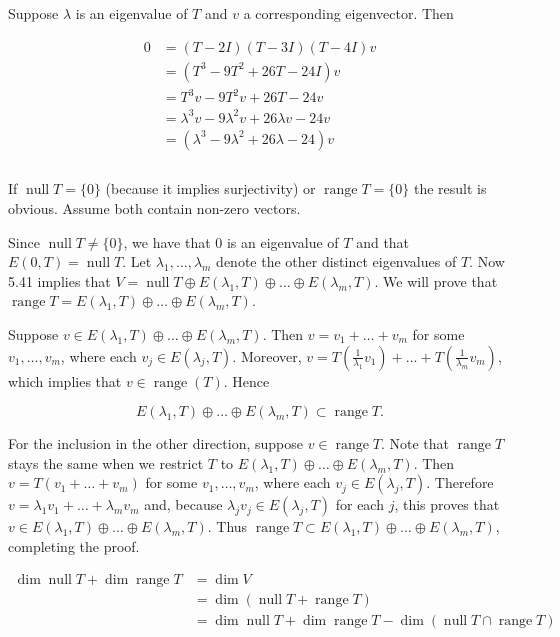 \documentclass[a4paper]{article}
\newcommand\n{\newpage}
\begin{document}
Suppose $\lambda$ is an eigenvalue of $T$ and $v$ a corresponding eigenvector. Then

$$ \begin{aligned} 0 &= (T - 2I)(T - 3I)(T - 4I)v\\ &= (T^3 - 9T^2 + 26T - 24I)v\\ &= T^3 v - 9T^2 v + 26T - 24v\\ &= \lambda^3 v - 9\lambda^2 v + 26\lambda v - 24v\\ &= (\lambda^3 - 9\lambda^2 + 26\lambda - 24)v\\ \end{aligned} $$
\\



If $\operatorname{null} T = \{0\}$ (because it implies surjectivity) or $\operatorname{range} T = \{0\}$ the result is obvious. Assume both contain non-zero vectors.

Since $\operatorname{null} T \neq \{0\}$, we have that $0$ is an eigenvalue of $T$ and that $E(0, T) = \operatorname{null} T$. Let $\lambda_1, \dots, \lambda_m$ denote the other distinct eigenvalues of $T$. Now 5.41 implies that $V = \operatorname{null} T \oplus E(\lambda_1, T) \oplus \dots \oplus E(\lambda_m, T)$. We will prove that $\operatorname{range} T = E(\lambda_1, T) \oplus \dots \oplus E(\lambda_m, T)$.

Suppose $v \in E(\lambda_1, T) \oplus \dots \oplus E(\lambda_m, T)$. Then $v = v_1 + \dots + v_m$ for some $v_1, \dots, v_m$, where each $v_j \in E(\lambda_j, T)$. Moreover, $v = T(\frac{1}{\lambda_1}v_1) + \dots + T(\frac{1}{\lambda_m}v_m)$, which implies that $v \in \operatorname{range}(T)$. Hence

$$E(\lambda_1, T) \oplus \dots \oplus E(\lambda_m, T) \subset \operatorname{range} T.$$

For the inclusion in the other direction, suppose $v \in \operatorname{range} T$. Note that $\operatorname{range} T$ stays the same when we restrict $T$ to $E(\lambda_1, T) \oplus \dots \oplus E(\lambda_m, T)$. Then $v = T(v_1 + \dots + v_m)$ for some $v_1, \dots, v_m$, where each $v_j \in E(\lambda_j, T)$. Therefore $v = \lambda_1 v_1 + \dots + \lambda_m v_m$ and, because $\lambda_j v_j \in E(\lambda_j, T)$ for each $j$, this proves that $v \in E(\lambda_1, T) \oplus \dots \oplus E(\lambda_m, T)$. Thus $\operatorname{range} T \subset E(\lambda_1, T) \oplus \dots \oplus E(\lambda_m, T)$, completing the proof.
\n

$$ \begin{aligned} \operatorname{dim} \operatorname{null} T + \operatorname{dim} \operatorname{range} T &= \operatorname{dim} V\\ &= \operatorname{dim} (\operatorname{null} T + \operatorname{range} T)\\ &= \operatorname{dim} \operatorname{null} T + \operatorname{dim} \operatorname{range} T - \operatorname{dim}(\operatorname{null} T \cap \operatorname{range} T)\\ \end{aligned} $$
\end{document}
